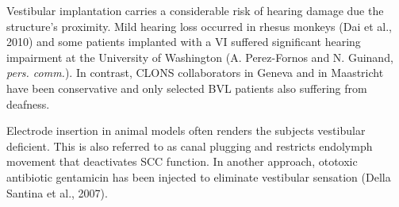 Vestibular implantation carries a considerable risk of hearing damage due the structure's proximity. Mild hearing loss occurred in rhesus monkeys (Dai et al., 2010) and some patients implanted with a VI suffered significant hearing impairment at the University of Washington (A. Perez-Fornos and N. Guinand, \textit{pers. comm.}). In contrast, CLONS collaborators in Geneva and in Maastricht have been conservative and only selected BVL patients also suffering from deafness.

Electrode insertion in animal models often renders the subjects vestibular deficient. This is also referred to as canal plugging and restricts endolymph movement that deactivates SCC function. In another approach, ototoxic antibiotic gentamicin has been injected to eliminate vestibular sensation (Della Santina et al., 2007).

